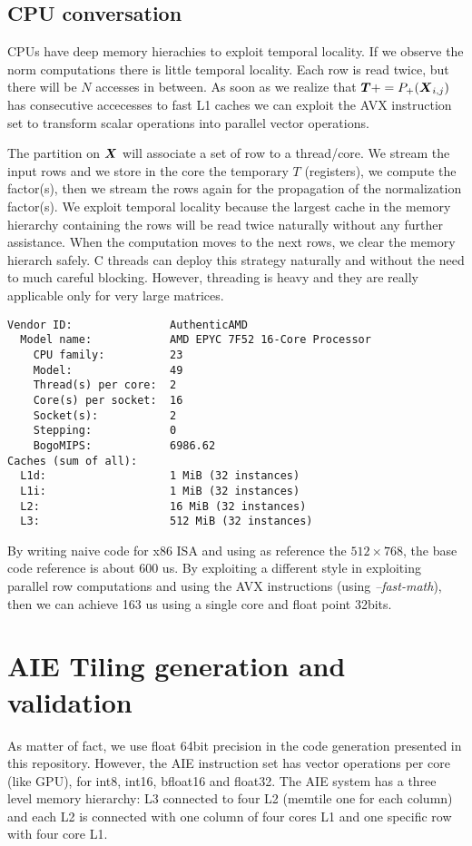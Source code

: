\documentclass[acmsmall]{acmart}
\begin{document}
\subsection{CPU conversation}
CPUs have deep memory hierachies to exploit temporal locality. If we
observe the norm computations there is little temporal locality. Each
row is read twice, but there will be $N$ accesses in between. As soon
as we realize that ${\boldsymbol T} += P_+({\boldsymbol X}_{i,j})$ has consecutive
accecesses to fast L1 caches we can exploit the AVX instruction set to
transform scalar operations into parallel vector operations.

The partition on ${\boldsymbol X}$ will associate a set of row to a
thread/core. We stream the input rows and we store in the core the
temporary $T$ (registers), we compute the factor(s), then we stream
the rows again for the propagation of the normalization factor(s). We
exploit temporal locality because the largest cache in the memory
hierarchy containing the rows will be read twice naturally without any
further assistance. When the computation moves to the next rows, we
clear the memory hierarch safely. C threads can deploy this strategy
naturally and without the need to much careful blocking. However,
threading is heavy and they are really applicable only for very large
matrices.

{\small \begin{verbatim}
Vendor ID:               AuthenticAMD
  Model name:            AMD EPYC 7F52 16-Core Processor
    CPU family:          23
    Model:               49
    Thread(s) per core:  2
    Core(s) per socket:  16
    Socket(s):           2
    Stepping:            0
    BogoMIPS:            6986.62
Caches (sum of all):     
  L1d:                   1 MiB (32 instances)
  L1i:                   1 MiB (32 instances)
  L2:                    16 MiB (32 instances)
  L3:                    512 MiB (32 instances)
\end{verbatim} }

By writing naive code for x86 ISA and using as reference the $512
\times 768$, the base code reference is about 600 us. By exploiting a
different style in exploiting parallel row computations and using the
AVX instructions (using {\em --fast-math}), then we can achieve 163 us
using a single core and float point 32bits.

\section{AIE Tiling generation and validation}
As matter of fact, we use float 64bit precision in the code generation
presented in this repository. However, the AIE instruction set has
vector operations per core (like GPU), for int8, int16, bfloat16 and
float32. The AIE system has a three level memory hierarchy: L3
connected to four L2 (memtile one for each column) and each L2 is
connected with one column of four cores L1 and one specific row with
four core L1.
\end{document}
